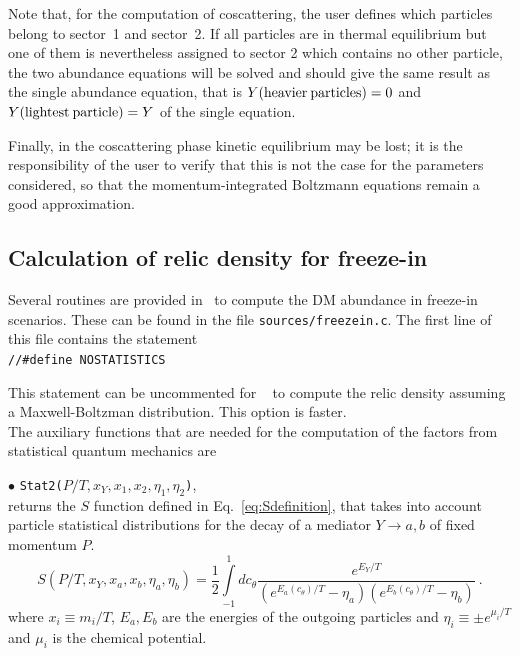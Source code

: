 \documentclass[12pt,a4paper]{article}
\begin{document}
 Note  that, for the computation of coscattering, the user defines which particles belong to sector~1 and sector~2.
If all particles are  in thermal equilibrium but one of them is nevertheless assigned to sector 2 which contains no other particle, the two abundance equations will be solved and should give the same result as the single abundance equation, that is $Y{\rm(heavier\:particles)}=0$ and $Y{\rm (lightest\:particle)}=Y$ of the single equation. 

Finally, in the coscattering phase kinetic equilibrium may be lost; 
it is the responsibility of the user to verify that this is not the case for the parameters considered, so that 
the momentum-integrated Boltzmann equations remain a good approximation. \\



\subsection{Calculation of relic density for freeze-in}
\label{sec:routines:freeze-in} 

Several routines are provided in \micro~to compute the DM abundance in freeze-in scenarios. These can be found in the file \verb|sources/freezein.c|. The first line of this file contains the statement \\
\verb|//#define NOSTATISTICS|

\noindent
This statement can be uncommented for \micro~ to compute the relic density assuming a Maxwell-Boltzman distribution. This option is faster. 
\\
The auxiliary functions that are needed for the computation of the factors from statistical quantum mechanics are 

\noindent
$\bullet$ \verb|Stat2(|$P/T,x_Y,x_1,x_2,\eta_1,\eta_2$\verb|)|,\\
 returns the $S$ function defined in Eq.~\eqref{eq:Sdefinition}, that takes into account particle statistical distributions for the decay of a mediator $Y \rightarrow a,b$ of fixed momentum $P$. 
\begin{equation}\label{eq:Sdefinition}
S\left( P/T, x_Y, x_a, x_b, \eta_a, \eta_b \right)= \frac{1}{2}\int\limits_{-1}^{1} dc_{\theta}
\frac{e^{E_Y/T}}{(e^{E_a(c_\theta)/T} - \eta_a)(e^{E_b(c_\theta)/T} - \eta_b)}\ .
\end{equation}
where $x_i \equiv m_i/T$, $E_a,E_b$ are the energies of the outgoing particles and $\eta_i \equiv \pm e^{\mu_i/T}$ and $\mu_i$ is the chemical potential.\\
\end{document}
